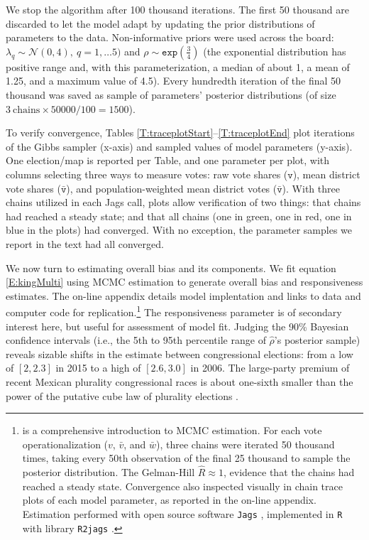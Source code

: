   \noindent We stop the algorithm after 100 thousand iterations. The first 50 thousand are discarded to let the model adapt by updating the prior distributions of parameters to the data. Non-informative priors were used across the board: $\lambda_q \sim \mathcal{N}(0, 4),~q=1,\ldots5)$ and $\rho \sim \texttt{exp}(\frac{3}{4})$ (the exponential distribution has positive range and, with this parameterization, a median of about 1, a mean of 1.25, and a maximum value of 4.5). Every hundredth iteration of the final 50 thousand was saved as sample of parameters' posterior distributions (of size $3~\text{chains} \times 50000/100 = 1500$). 

To verify convergence, Tables \ref{T:traceplotStart}--\ref{T:traceplotEnd} plot iterations of the Gibbs sampler (x-axis) and sampled values of model parameters (y-axis). One election/map is reported per Table, and one parameter per plot, with columns selecting three ways to measure votes: raw vote shares ($\texttt{v}$), mean district vote shares ($\bar{\texttt{v}}$), and population-weighted mean district votes ($\bar{\texttt{v}}$). With three chains utilized in each Jags call, plots allow verification of two things: that chains had reached a steady state; and that all chains (one in green, one in red, one in blue in the plots) had converged. With no exception, the parameter samples we report in the text had all converged.


We now turn to estimating overall bias and its components. We fit equation \ref{E:kingMulti} using MCMC estimation to generate overall bias and responsiveness estimates. The on-line appendix details model implentation and links to data and computer code for replication.\footnote{\citet{gelman.hill.2007} is a comprehensive introduction to MCMC estimation. For each vote operationalization ($v$, $\bar{v}$, and $\bar{w}$), three chains were iterated 50 thousand times, taking every 50th observation of the final 25 thousand to sample the posterior distribution. The Gelman-Hill $\hat{R} \approx 1$, evidence that the chains had reached a steady state. Convergence also inspected visually in chain trace plots of each model parameter, as reported in the on-line appendix. Estimation performed with open source software \texttt{Jags} \citep{jags.cite}, implemented in \texttt{R} \citep{r.cite} with library \texttt{R2jags} \citep{r.r2jags}.} The responsiveness parameter is of secondary interest here, but useful for assessment of model fit. Judging the 90\% Bayesian confidence intervals (i.e., the 5th to 95th percentile range of $\hat{\rho}$'s posterior sample) reveals sizable shifts in the estimate between congressional elections: from a low of $[2,2.3]$ in 2015 to a high of $[2.6,3.0]$ in 2006. The large-party premium of recent Mexican plurality congressional races is about one-sixth smaller than the power of the putative cube law of plurality elections \citep{taagepera.CubeLaw.1973}.


